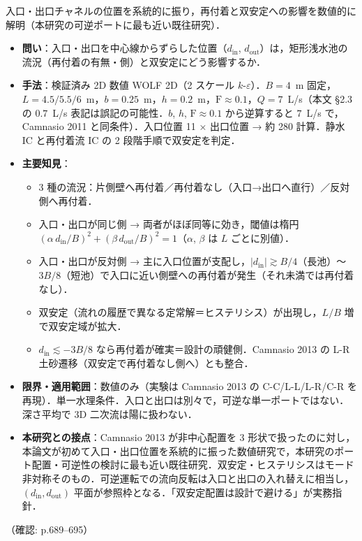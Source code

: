 \documentclass[11pt]{jsarticle}
\newcommand{\litref}[1]{{\large\bfseries\color{citecolor}#1}}
\begin{document}
\noindent\litref{Ferrara et al. (2018)}\quad 入口・出口チャネルの位置を系統的に振り，再付着と双安定への影響を数値的に解明（本研究の可逆ポートに最も近い既往研究）．
\begin{itemize}
  \item \textbf{問い}：入口・出口を中心線からずらした位置（$d_\mathrm{in}$, $d_\mathrm{out}$）は，矩形浅水池の流況（再付着の有無・側）と双安定にどう影響するか．
  \item \textbf{手法}：検証済み 2D 数値 WOLF 2D（2 スケール $k$-$\varepsilon$）．$B = 4$~m 固定，$L = 4.5/5.5/6$~m，$b = 0.25$~m，$h = 0.2$~m，$\mathrm{F} \approx 0.1$，$Q = 7$~L/s（本文 §2.3 の $0.7$~L/s 表記は誤記の可能性．$b$, $h$, $\mathrm{F} \approx 0.1$ から逆算すると $7$~L/s で，Camnasio 2011 と同条件）．入口位置 11 × 出口位置 → 約 280 計算．静水 IC と再付着流 IC の 2 段階手順で双安定を判定．
  \item \textbf{主要知見}：
  \begin{itemize}
    \item 3 種の流況：片側壁へ再付着／再付着なし（入口→出口へ直行）／反対側へ再付着．
    \item 入口・出口が同じ側 → 両者がほぼ同等に効き，閾値は楕円 $(\alpha\,d_\mathrm{in}/B)^2 + (\beta\,d_\mathrm{out}/B)^2 = 1$（$\alpha$, $\beta$ は $L$ ごとに別値）．
    \item 入口・出口が反対側 → 主に入口位置が支配し，$|d_\mathrm{in}| \gtrsim B/4$（長池）〜$3B/8$（短池）で入口に近い側壁への再付着が発生（それ未満では再付着なし）．
    \item 双安定（流れの履歴で異なる定常解＝ヒステリシス）が出現し，$L/B$ 増で双安定域が拡大．
    \item $d_\mathrm{in} \lesssim -3B/8$ なら再付着が確実＝設計の頑健側．Camnasio 2013 の L-R 土砂遷移（双安定で再付着なし側へ）とも整合．
  \end{itemize}
  \item \textbf{限界・適用範囲}：数値のみ（実験は Camnasio 2013 の C-C/L-L/L-R/C-R を再現）．単一水理条件．入口と出口は別々で，可逆な単一ポートではない．深さ平均で 3D 二次流は陽に扱わない．
  \item \textbf{本研究との接点}：Camnasio 2013 が非中心配置を 3 形状で扱ったのに対し，本論文が初めて入口・出口位置を系統的に振った数値研究で，本研究のポート配置・可逆性の検討に最も近い既往研究．双安定・ヒステリシスはモード非対称そのもの．可逆運転での流向反転は入口と出口の入れ替えに相当し，$(d_\mathrm{in}, d_\mathrm{out})$ 平面が参照枠となる．「双安定配置は設計で避ける」が実務指針．
\end{itemize}
\noindent（確認: p.689--695）
\end{document}
